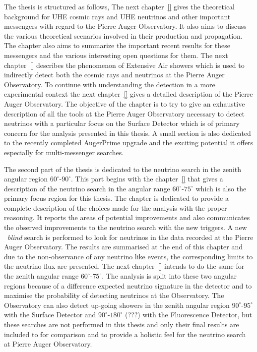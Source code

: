 The thesis is structured as follows, The next chapter~\ref{} gives the theoretical background for UHE cosmic rays and UHE neutrinos and other important messengers with regard to the Pierre Auger Observatory. It also aims to discuss the various theoretical scenarios involved in their production and propagation. The chapter also aims to summarize the important recent results for these messengers and the various interesting open questions for them. The next chapter~\ref{} describes the phenomenon of Extensive Air showers which is used to indirectly detect both the cosmic rays and neutrinos at the Pierre Auger Observatory. To continue with understanding the detection in a more experimental context the next chapter~\ref{} gives a detailed description of the Pierre Auger Observatory. The objective of the chapter is to try to give an exhaustive description of all the tools at the Pierre Auger Observatory necessary to detect neutrinos with a particular focus on the Surface Detector which is of primary concern for the analysis presented in this thesis. A small section is also dedicated to the recently completed AugerPrime upgrade and the exciting potential it offers especially for multi-messenger searches. 

The second part of the thesis is dedicated to the neutrino search in the zenith angular region $60^\circ$-$90^\circ$. This part begins with the chapter~\ref{} that gives a description of the neutrino search in the angular range $60^\circ$-$75^\circ$ which is also the primary focus region for this thesis. The chapter is dedicated to provide a complete description of the choices made for the analysis with the proper reasoning. It reports the areas of potential improvements and also communicates the observed improvements to the neutrino search with the new triggers. A new ~\textit{blind} search is performed to look for neutrinos in the data recorded at the Pierre Auger Observatory. The results are summarised at the end of this chapter and due to the non-observance of any neutrino like events, the corresponding limits to the neutrino flux are presented. The next chapter~\ref{} intends to do the same for the zenith angular range $60^\circ$-$75^\circ$. The analysis is split into these two angular regions because of a difference expected neutrino signature in the detector and to maximise the probability of detecting neutrinos at the Observatory. The Observatory can also detect up-going showers in the zenith angular region $90^\circ$-$95^\circ$ with the Surface Detector and $90^\circ$-$180^\circ$ (???) with the Fluorescence Detector, but these searches are not performed in this thesis and only their final results are included to for comparison and to provide a holistic feel for the neutrino search at Pierre Auger Observatory.

